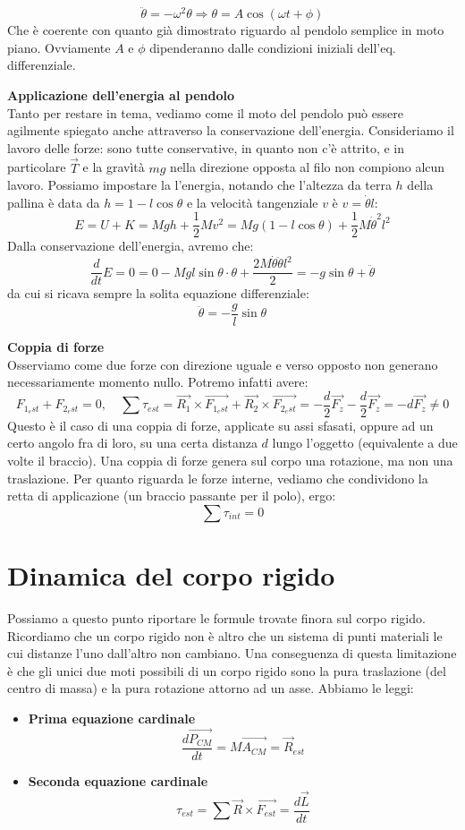 \documentclass[a4paper,12pt]{article}
\begin{document}
$$ \ddot{\theta} = -\omega^2 \theta \Rightarrow \theta = A\cos(\omega t+ \phi)$$
Che è coerente con quanto già dimostrato riguardo al pendolo semplice in moto piano. Ovviamente $A$ e $\phi$ dipenderanno
dalle condizioni iniziali dell'eq. differenziale.
\par\smallskip
\textbf{Applicazione dell'energia al pendolo} \\
Tanto per restare in tema, vediamo come il moto del pendolo può essere agilmente spiegato anche attraverso la conservazione dell'energia.
Consideriamo il lavoro delle forze: sono tutte conservative, in quanto non c'è attrito, e in particolare $\vec{T}$ e la gravìtà $mg$ nella direzione
opposta al filo non compiono alcun lavoro. Possiamo impostare la l'energia, notando che l'altezza da terra $h$ della pallina è data
da $h = 1 - l\cos{\theta}$ e la velocità tangenziale $v$ è $v = \dot{\theta} l$:
$$ E = U + K = Mgh + \frac{1}{2}Mv^2 = Mg(1 - l\cos{\theta}) + \frac{1}{2}M\dot{\theta}^2l^2 $$
Dalla conservazione dell'energia, avremo che:
$$ \frac{d}{dt}E = 0 = 0 -Mgl\sin{\theta}\cdot{\theta} + \frac{2M\dot{\theta}\ddot{\theta}l^2}{2} = -g\sin{\theta} + \ddot{\theta}$$
da cui si ricava sempre la solita equazione differenziale:
$$ \ddot{\theta} = -\frac{g}{l}\sin{\theta} $$
\par\smallskip
\textbf{Coppia di forze} \\
Osserviamo come due forze con direzione uguale e verso opposto non generano necessariamente momento nullo.
Potremo infatti avere:
$$ F_{1_est} + F_{2_est} = 0, \quad \sum \tau_{est} = \vec{R_1} \times \vec{F_{1_est}} + \vec{R_2} \times \vec{F_{2_est}} = -\frac{d}{2}\vec{F_z} -\frac{d}{2}\vec{F_z} = -d\vec{F_z} \neq 0 $$
Questo è il caso di una coppia di forze, applicate su assi sfasati, oppure ad un certo angolo fra di loro, su una certa distanza
$d$ lungo l'oggetto (equivalente a due volte il braccio). Una coppia di forze genera sul corpo una rotazione, ma non una traslazione. Per quanto
riguarda le forze interne, vediamo che condividono la retta di applicazione (un braccio passante per il polo), ergo:
$$ \sum \tau_{int} = 0 $$
\section{Dinamica del corpo rigido}
Possiamo a questo punto riportare le formule trovate finora sul corpo rigido. Ricordiamo che un corpo rigido non è
altro che un sistema di punti materiali le cui distanze l'uno dall'altro non cambiano. Una conseguenza di questa limitazione
è che gli unici due moti possibili di un corpo rigido sono la pura traslazione (del centro di massa) e la pura rotazione attorno ad un asse. Abbiamo
le leggi:
\begin{itemize}
  \item \textbf{Prima equazione cardinale}
$$ \frac{d\vec{P_{CM}}}{dt} = M\vec{A_{CM}} = \vec{R}_{est} $$
  \item \textbf{Seconda equazione cardinale}
$$ \tau_{est} = \sum \vec{R} \times \vec{F_{est}} = \frac{d\vec{L}}{dt}$$
\end{itemize}
\end{document}
